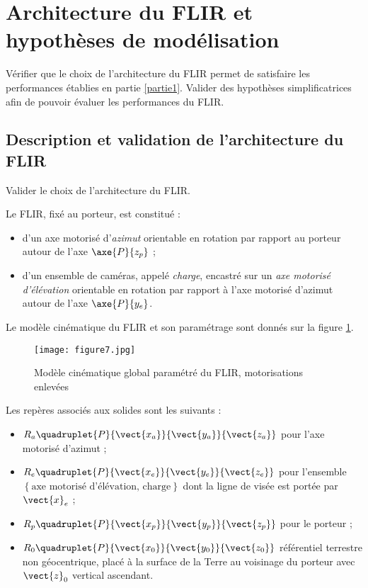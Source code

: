
\section{Architecture du FLIR et hypothèses de modélisation}\label{partie2}

\begin{obj}
Vérifier que le choix de l'architecture du FLIR permet de satisfaire les performances établies en partie \ref{partie1}.
Valider des hypothèses simplificatrices afin de pouvoir évaluer les performances du FLIR.
\end{obj}

\subsection{Description et validation de l'architecture du FLIR}

\begin{obj}
Valider le choix de l'architecture du FLIR.
\end{obj}

Le FLIR, fixé au porteur, est constitué :
\begin{itemize}
\item d'un axe motorisé d'\textit{azimut} orientable en rotation par rapport au porteur autour de l'axe $\axe{P}{{z_p}}$ ;
\item d'un ensemble de caméras, appelé \textit{charge}, encastré sur un \textit{axe motorisé d'élévation} orientable en rotation
par rapport à l'axe motorisé d'azimut autour de l'axe $\axe{P}{{y_e}}$.
\end{itemize}

Le modèle cinématique du FLIR et son paramétrage sont donnés sur la figure \ref{figure7}.

\begin{figure}[!htb]
\begin{center}
\texttt{[image: figure7.jpg]}
\caption{Modèle cinématique global paramétré du FLIR, motorisations enlevées \label{figure7}}
\end{center}
\end{figure}

Les repères associés aux solides sont les suivants :
\begin{itemize}
\item $R_a\quadruplet{P}{\vect{x_a}}{\vect{y_a}}{\vect{z_a}}$ pour l'axe motorisé d'azimut ;
\item $R_e\quadruplet{P}{\vect{x_e}}{\vect{y_e}}{\vect{z_e}}$ pour l'ensemble $\left\{\text{axe motorisé d'élévation, charge}\right\}$ dont la ligne de visée est portée par $\vect{x}_e$ ;
\item $R_p\quadruplet{P}{\vect{x_p}}{\vect{y_p}}{\vect{z_p}}$ pour le porteur ;
\item $R_0\quadruplet{P}{\vect{x_0}}{\vect{y_0}}{\vect{z_0}}$ référentiel terrestre non géocentrique, placé à la surface de la Terre au voisinage du porteur avec $\vect{z}_0$ vertical ascendant.
\end{itemize}

